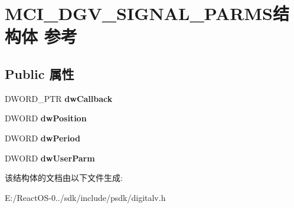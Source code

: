 \hypertarget{struct_m_c_i___d_g_v___s_i_g_n_a_l___p_a_r_m_s}{}\section{M\+C\+I\+\_\+\+D\+G\+V\+\_\+\+S\+I\+G\+N\+A\+L\+\_\+\+P\+A\+R\+M\+S结构体 参考}
\label{struct_m_c_i___d_g_v___s_i_g_n_a_l___p_a_r_m_s}
\subsection*{Public 属性}
\begin{DoxyCompactItemize}
\item 
\mbox{\label{struct_m_c_i___d_g_v___s_i_g_n_a_l___p_a_r_m_s_a8ee2b2c6553ea1cac1e0114432864bc8}} 
D\+W\+O\+R\+D\+\_\+\+P\+TR {\bfseries dw\+Callback}
\item 
\mbox{\label{struct_m_c_i___d_g_v___s_i_g_n_a_l___p_a_r_m_s_a05288419126d6a902d6e7999174136b6}} 
D\+W\+O\+RD {\bfseries dw\+Position}
\item 
\mbox{\label{struct_m_c_i___d_g_v___s_i_g_n_a_l___p_a_r_m_s_a537382b865a62e5897325c2a3b2a33b5}} 
D\+W\+O\+RD {\bfseries dw\+Period}
\item 
\mbox{\label{struct_m_c_i___d_g_v___s_i_g_n_a_l___p_a_r_m_s_a26d5ca777ac784273f68237c9e12a235}} 
D\+W\+O\+RD {\bfseries dw\+User\+Parm}
\end{DoxyCompactItemize}


该结构体的文档由以下文件生成\+:\begin{DoxyCompactItemize}
\item 
E\+:/\+React\+O\+S-\/0../sdk/include/psdk/digitalv.\+h\end{DoxyCompactItemize}

